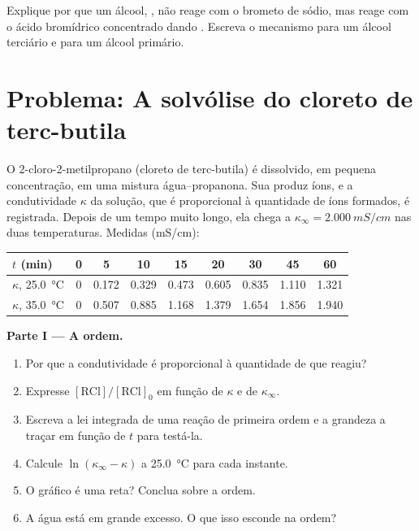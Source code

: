 \begin{exercise}[$\star\star\star$]\label{exo:b1:nucleophilic-substitution:12}
Explique por que um álcool, , não reage com o brometo de sódio,
mas reage com o ácido bromídrico concentrado dando . Escreva o
mecanismo para um álcool terciário e para um álcool primário.
\end{exercise}

\section{Problema: A solvólise do cloreto de terc-butila}

\begin{problem}
\label{pb:b1:nucleophilic-substitution:1}
O 2-cloro-2-metilpropano (cloreto de terc-butila) é dissolvido, em
pequena concentração, em uma mistura água--propanona. Sua 
 produz íons, e a
condutividade $\kappa$ da solução, que é proporcional à quantidade de
íons formados, é registrada. Depois de um tempo muito longo, ela chega a
$\kappa_\infty = \qty{2.000}{mS/cm}$ nas duas temperaturas. Medidas
(\unit{mS/cm}):

\begin{center}
\begin{tabular}{lcccccccc}
\hline
$t$ (min) & 0 & 5 & 10 & 15 & 20 & 30 & 45 & 60 \\
\hline
$\kappa$, \qty{25.0}{\celsius} & 0 & 0.172 & 0.329 & 0.473 & 0.605 & 0.835 & 1.110 & 1.321 \\
$\kappa$, \qty{35.0}{\celsius} & 0 & 0.507 & 0.885 & 1.168 & 1.379 & 1.654 & 1.856 & 1.940 \\
\hline
\end{tabular}
\end{center}

\medskip
\noindent\textbf{Parte I --- A ordem.}
\begin{enumerate}
  \item Por que a condutividade é proporcional à quantidade de 
        que reagiu?
  \item Expresse $[\mathrm{RCl}]/[\mathrm{RCl}]_0$ em função de $\kappa$ e
        de $\kappa_\infty$.
  \item Escreva a lei integrada de uma reação de primeira ordem e a
        grandeza a traçar em função de $t$ para testá-la.
  \item Calcule $\ln(\kappa_\infty - \kappa)$ a \qty{25.0}{\celsius} para
        cada instante.
  \item O gráfico é uma reta? Conclua sobre a ordem.
  \item A água está em grande excesso. O que isso esconde na ordem?
\end{enumerate}


\end{problem}
